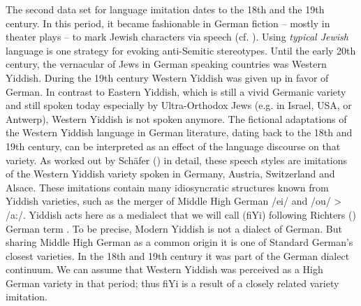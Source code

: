 \documentclass[output=paper]{LSP/langsci}
\begin{document}
The second data set for language imitation dates to the 18th and the 19th century. In this period, it became fashionable in German fiction – mostly in theater plays – to mark Jewish characters via speech (cf. \citealt{richter_sprache_1995}). Using \textit{typical Jewish} language is one strategy for evoking anti-Semitic stereotypes.
  Until the early 20th century, the vernacular of Jews in German speaking countries was  Western Yiddish. During the 19th century Western Yiddish was given up in favor of German. In contrast to Eastern Yiddish, which is still a vivid Germanic variety and still spoken today especially by Ultra-Orthodox Jews (e.g. in Israel, USA, or Antwerp), Western Yiddish is not spoken anymore. The fictional adaptations of the Western Yiddish language in German literature, dating back to the 18th and 19th century, can be interpreted as an effect of the language discourse on that variety.
   As worked out by Sch\"afer (\citeyear{schafer_imitationen_2014}) in detail, these speech styles are imitations of the Western Yiddish variety spoken in Germany, Austria,  Switzerland and  Alsace. These imitations contain many idiosyncratic structures known from Yiddish varieties, such as the merger of Middle High German /ei/ and /ou/ > /a:/. Yiddish acts here as a medialect that we will call  (fiYi) following Richters (\citeyear{richter_sprache_1995}) German term . To be precise, Modern Yiddish is not a dialect of German. But sharing Middle High German as a common origin it is one of Standard German’s closest varieties. In the 18th and 19th century it was part of the German dialect continuum. We can assume that Western Yiddish was perceived as a High German variety in that period; thus fiYi is a result of a closely related variety imitation.
\end{document}
